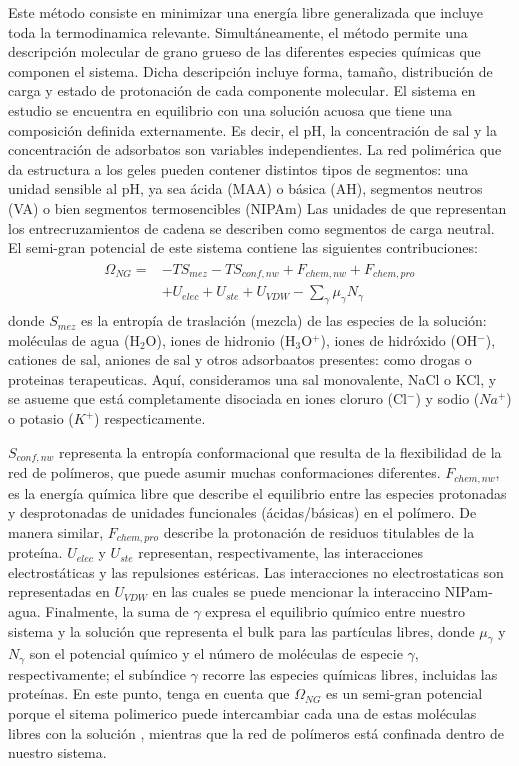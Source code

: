 Este método consiste en minimizar una energía libre generalizada que incluye toda la termodinamica relevante.
Simultáneamente, el método permite una descripción molecular de grano grueso de las diferentes especies químicas que componen el sistema.
Dicha descripción incluye forma, tamaño, distribución de carga y estado de protonación de cada componente molecular.
El sistema en estudio se encuentra en  equilibrio con una solución acuosa que tiene una composición  definida externamente.
Es decir, el pH, la concentración de sal y la concentración de adsorbatos son variables independientes.
La red polimérica que da estructura a los geles pueden contener distintos tipos de segmentos: una unidad sensible al pH, ya sea ácida (MAA) o básica (AH), segmentos neutros (VA) o bien segmentos termosencibles (NIPAm)
Las unidades de que representan los entrecruzamientos de cadena se describen como segmentos de carga neutral.
El semi-gran potencial de este sistema contiene las siguientes contribuciones:
\begin{align}
\begin{aligned}
\Omega_{NG}=& -TS_{mez} -TS_{conf,nw} + F_{chem,nw} + F_{chem,pro}\\
& + U_{elec} + U_{ste} + U_{VDW} - {\sum_{\gamma}{\mu_\gamma N_\gamma}}
\end{aligned}
\label{eq:semicano}
\end{align}
\noindent donde $S_{mez}$ es la entropía de traslación (mezcla) de las especies de la solución: moléculas de agua (H$_2$O), iones de hidronio (H$_3$O$^+$), iones de hidróxido (OH$^- $), cationes de sal, aniones de sal y otros adsorbaatos presentes: como drogas o proteinas terapeuticas.
Aquí, consideramos una sal monovalente, NaCl o KCl, y se asueme que está completamente disociada en iones cloruro (Cl$^-$) y sodio ($Na^+$) o potasio ($K^+$) respecticamente. 

$S_{conf,nw}$ representa la entropía conformacional que resulta de la flexibilidad de la red de polímeros, que puede asumir muchas conformaciones diferentes.
$F_{chem,nw}$, es la energía química libre que describe el equilibrio entre las especies protonadas y desprotonadas de unidades funcionales (ácidas/básicas) en el polímero.
De manera similar, $F_{chem,pro}$ describe la protonación de residuos titulables de la proteína.
$U_{elec}$ y $U_{ste}$ representan, respectivamente, las interacciones electrostáticas y las repulsiones estéricas.
Las interacciones no electrostaticas son representadas en $U_{VDW}$ en las cuales se puede mencionar la interaccino NIPam-agua.
Finalmente, la suma de $\gamma$ expresa el equilibrio químico entre nuestro sistema y la solución  que representa el bulk para las partículas libres, donde $\mu_\gamma$ y $N_\gamma$ son el potencial químico y el número de moléculas de especie $\gamma$, respectivamente;
el subíndice $\gamma$ recorre las especies químicas libres, incluidas las proteínas.
En este punto, tenga en cuenta que $\Omega_{NG}$ es un semi-gran potencial porque el sitema polimerico puede intercambiar cada una de estas moléculas libres con la solución , mientras que la red de polímeros está confinada dentro de nuestro sistema.


